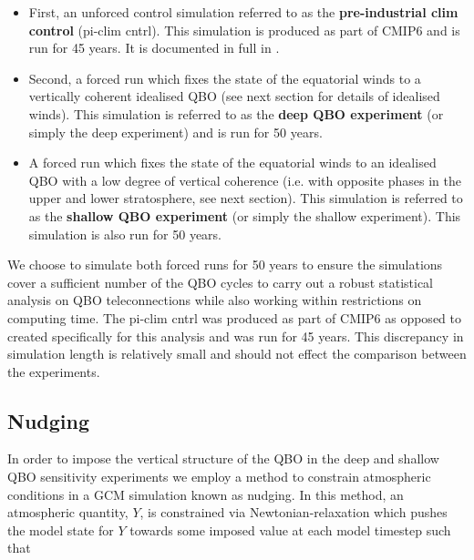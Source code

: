 \begin{itemize}
    \item First, an unforced control simulation referred to as the \textbf{pre-industrial clim control} (pi-clim cntrl). This simulation is produced as part of CMIP6 and is run for 45 years. It is documented in full in \cite{oconnorAssessment2021b}. 
    
    \item Second, a forced run which fixes the state of the equatorial winds to a vertically coherent idealised QBO (see next section for details of idealised winds). This simulation is referred to as the \textbf{deep QBO experiment} (or simply the deep experiment) and is run for 50 years.
    
    \item A forced run which fixes the state of the equatorial winds to an idealised QBO with a low degree of vertical coherence (i.e. with opposite phases in the upper and lower stratosphere, see next section). This simulation is referred to as the \textbf{shallow QBO experiment} (or simply the shallow experiment). This simulation is also run for 50 years.
    
\end{itemize}

We choose to simulate both forced runs for 50 years to ensure the simulations cover a sufficient number of the QBO cycles to carry out a robust statistical analysis on QBO teleconnections while also working within restrictions on computing time. The pi-clim cntrl was produced as part of CMIP6 as opposed to created specifically for this analysis and was run for 45 years. This discrepancy in simulation length is relatively small and should not effect the comparison between the experiments. 



\subsection{Nudging}
In order to impose the vertical structure of the QBO in the deep and shallow QBO sensitivity experiments we employ a method to constrain atmospheric conditions in a GCM simulation known as nudging. In this method, an atmospheric quantity, $Y$, is constrained via Newtonian-relaxation which pushes the model state for $Y$ towards some imposed value at each model timestep such that

